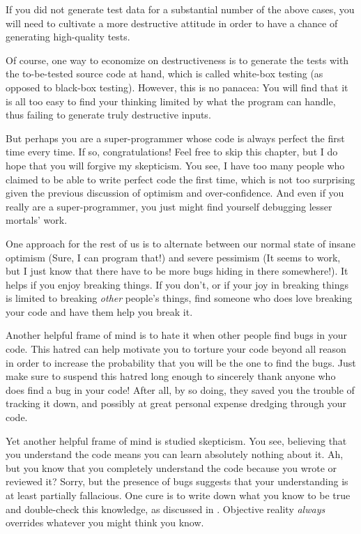 {	If you did not generate test data for a substantial number of
	the above cases, you will need to cultivate a more destructive
	attitude in order to have a chance of generating high-quality
	tests.

	Of course, one way to economize on destructiveness is to
	generate the tests with the to-be-tested source code at hand,
	which is called white-box testing (as opposed to black-box testing).
	However, this is no panacea: You will find that it is all too
	easy to find your thinking limited by what the program can handle,
	thus failing to generate truly destructive inputs.
}\QuickQuizEnd

But perhaps you are a super-programmer whose code is always perfect
the first time every time.
If so, congratulations!
Feel free to skip this chapter, but
I do hope that you will forgive my skepticism.
You see, I have too many people who claimed to be able to write perfect
code the first time, which is not too surprising given the previous
discussion of optimism and over-confidence.
And even if you really are a super-programmer, you just might
find yourself debugging lesser mortals' work.

One approach for the rest of us is to alternate between our normal
state of insane optimism
(Sure, I can program that!) and severe pessimism
(It seems to work, but I just know that there have to be more bugs hiding
in there somewhere!).
It helps if you enjoy breaking things.
If you don't, or if your joy in breaking things is limited to breaking
\emph{other} people's things, find someone who does love breaking your
code and have them help you break it.

Another helpful frame of mind is to hate it when other people find bugs in
your code.
This hatred can help motivate you to torture your code beyond all reason
in order to increase the probability that you will be the one to find
the bugs.
Just make sure to suspend this hatred long enough to sincerely thank
anyone who does find a bug in your code!
After all, by so doing, they saved you the trouble of tracking it down,
and possibly at great personal expense dredging through your code.

Yet another helpful frame of mind is studied skepticism.
You see, believing that you understand the code means you can learn
absolutely nothing about it.
Ah, but you know that you completely understand the code because you
wrote or reviewed it?
Sorry, but the presence of bugs suggests that your understanding is at
least partially fallacious.
One cure is to write down what you know to be true and double-check this
knowledge, as discussed in
.
Objective reality \emph{always} overrides whatever you
might think you know.

